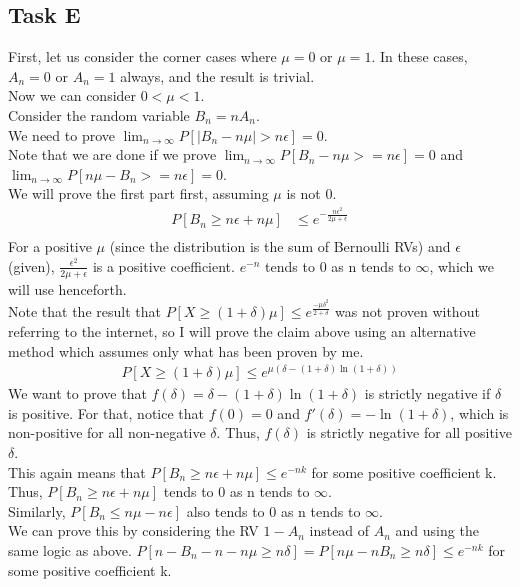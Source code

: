 \subsection{Task E}
First, let us consider the corner cases where $\mu = 0$ or $\mu = 1$. In these cases, $A_n=0$ or $A_n=1$ always, and the result is trivial.\\ 
Now we can consider $0 < \mu < 1$.\\
Consider the random variable $B_n = nA_n$.\\
We need to prove $\lim_{n\to \infty}P[\lvert B_n - n\mu\rvert > n\epsilon]=0$.\\
Note that we are done if we prove $\lim_{n\to \infty}P[B_n - n\mu >= n\epsilon]=0$ and $\lim_{n\to \infty}P[n\mu - B_n >= n\epsilon]=0$.\\
We will prove the first part first, assuming $\mu$ is not 0.\\
\begin{align*}
    P[B_n \ge n\epsilon + n\mu] &\le e^{-\frac{n\epsilon^2}{2\mu+\epsilon}}\\
\end{align*}
For a positive $\mu$ (since the distribution is the sum of Bernoulli RVs) and $\epsilon$ (given), $\frac{\epsilon^2}{2\mu+\epsilon}$ is a positive coefficient. $e^{-n}$ tends to 0 as n tends to $\infty$, which we will use henceforth.\\
Note that the result that $P[X \ge (1+\delta)\mu] \le e^{\frac{-\mu\delta^2}{2+\delta}}$ was not proven without referring to the internet, so I will prove the claim above using an alternative method which assumes only what has been proven by me.\\
\begin{align*}
    P[X \ge (1+\delta)\mu] \le e^{\mu(\delta-(1+\delta)\ln(1+\delta))}
\end{align*}
We want to prove that $f(\delta)=\delta-(1+\delta)\ln(1+\delta)$ is strictly negative if $\delta$ is positive. For that, notice that $f(0)=0$ and $f'(\delta)=-\ln(1+\delta)$, which is non-positive for all non-negative $\delta$. Thus, $f(\delta)$ is strictly negative for all positive $\delta$.\\
This again means that $P[B_n \ge n\epsilon + n\mu] \le e^{-nk}$ for some positive coefficient k. Thus, $P[B_n \ge n\epsilon + n\mu]$ tends to 0 as n tends to $\infty$.\\
Similarly, $P[B_n \le n\mu - n\epsilon]$ also tends to 0 as n tends to $\infty$.\\
We can prove this by considering the RV $1-A_n$ instead of $A_n$ and using the same logic as above. $P[n-B_n - n-n\mu \ge n\delta] = P[n\mu - nB_n \ge n\delta] \le e^{-nk}$ for some positive coefficient k.\\
